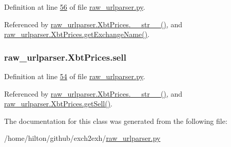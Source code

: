 Definition at line \hyperlink{raw__urlparser_8py_source_l00056}{56} of file \hyperlink{raw__urlparser_8py_source}{raw\+\_\+urlparser.\+py}.



Referenced by \hyperlink{raw__urlparser_8py_source_l00074}{raw\+\_\+urlparser.\+Xbt\+Prices.\+\_\+\+\_\+str\+\_\+\+\_\+()}, and \hyperlink{raw__urlparser_8py_source_l00068}{raw\+\_\+urlparser.\+Xbt\+Prices.\+get\+Exchange\+Name()}.

\subsubsection[{\texorpdfstring{sell}{sell}}]{\setlength{\rightskip}{0pt plus 5cm}raw\+\_\+urlparser.\+Xbt\+Prices.\+sell}\hypertarget{classraw__urlparser_1_1_xbt_prices_a22b483cac27a5b17f9e7b265c219bb99}{}\label{classraw__urlparser_1_1_xbt_prices_a22b483cac27a5b17f9e7b265c219bb99}


Definition at line \hyperlink{raw__urlparser_8py_source_l00054}{54} of file \hyperlink{raw__urlparser_8py_source}{raw\+\_\+urlparser.\+py}.



Referenced by \hyperlink{raw__urlparser_8py_source_l00074}{raw\+\_\+urlparser.\+Xbt\+Prices.\+\_\+\+\_\+str\+\_\+\+\_\+()}, and \hyperlink{raw__urlparser_8py_source_l00065}{raw\+\_\+urlparser.\+Xbt\+Prices.\+get\+Sell()}.



The documentation for this class was generated from the following file\+:\begin{DoxyCompactItemize}
\item 
/home/hilton/github/exch2exh/\hyperlink{raw__urlparser_8py}{raw\+\_\+urlparser.\+py}\end{DoxyCompactItemize}
